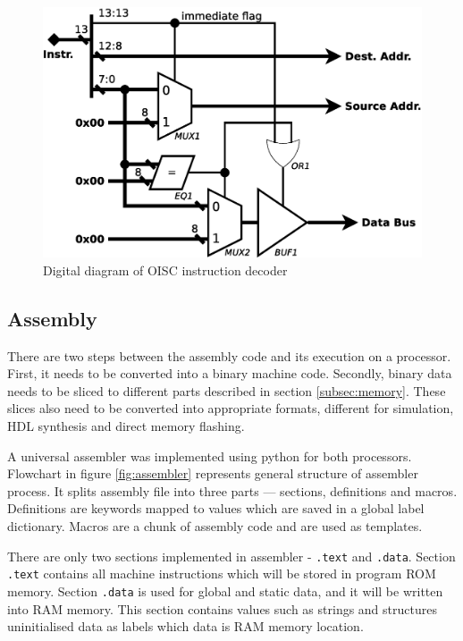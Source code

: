 \begin{figure}
	\centering
	\includegraphics[scale=0.4]{../resources/oisc_decoder.eps}
	\caption{Digital diagram of OISC instruction decoder}
	\label{fig:oisc_decoder}
\end{figure}

\subsection{Assembly}\label{subsec:assembly}
There are two steps between the assembly code and its execution on a processor. First, it needs to be converted into a binary machine code. Secondly, binary data needs to be sliced to different parts described in section \ref{subsec:memory}. These slices also need to be converted into appropriate formats, different for simulation, HDL synthesis and direct memory flashing. 

A universal assembler was implemented using python for both processors. Flowchart in figure \ref{fig:assembler} represents general structure of assembler process. It splits assembly file into three parts — sections, definitions and macros. Definitions are keywords mapped to values which are saved in a global label dictionary. Macros are a chunk of assembly code and are used as templates. 

There are only two sections implemented in assembler - \texttt{.text} and \texttt{.data}. Section \texttt{.text} contains all machine instructions which will be stored in program ROM memory. Section \texttt{.data} is used for global and static data, and it will be written into RAM memory. This section contains values such as strings and structures uninitialised data as labels which data is RAM memory location. 


